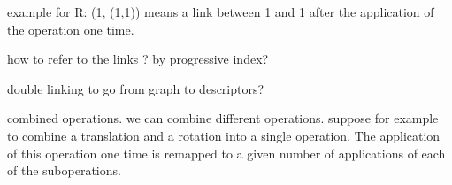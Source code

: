 example for R: (1, (1,1)) means a link between 1 and 1 after the application
of the operation one time.

how to refer to the links ? by progressive index?

double linking to go from graph to descriptors?

combined operations. we can combine different operations. suppose for
example to combine a translation and a rotation into a single operation. 
The application of this operation one time is remapped to a given number of
applications of each of the suboperations. 


 





